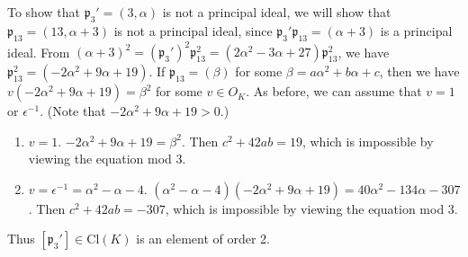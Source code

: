 \documentclass{article}
\newcommand{\Cl}{\mathrm{Cl}}
\begin{document}
To show that $\mathfrak{p}_{3}' = (3, \alpha)$ is not a principal ideal, we will show that $\mathfrak{p}_{13} = (13, \alpha + 3)$ is not a principal ideal, since $\mathfrak{p}_{3}'\mathfrak{p}_{13} = (\alpha + 3)$ is a  principal ideal. From $(\alpha+3)^{2} = (\mathfrak{p}_{3}')^{2}\mathfrak{p}_{13}^{2} = (2\alpha^{2} - 3\alpha + 27)\mathfrak{p}_{13}^{2}$, we have $\mathfrak{p}_{13}^{2} = (-2\alpha^{2} + 9\alpha + 19)$. 
If $\mathfrak{p}_{13} = (\beta)$ for some $\beta = a\alpha^{2} + b\alpha + c$, then we have $v(-2\alpha^{2} + 9\alpha + 19) = \beta^{2}$ for some $v\in O_{K}$. 
As before, we can assume that $v = 1$ or $\epsilon^{-1}$. (Note that $-2\alpha^{2} + 9\alpha + 19>0$.) 
\begin{enumerate}
\item $v = 1$. $-2\alpha^{2} + 9\alpha + 19 = \beta^{2}$. Then $c^{2} + 42 ab = 19$, which is impossible by viewing the equation mod 3. 
\item $v =\epsilon^{-1} =  \alpha^{2} - \alpha - 4$. $(\alpha^{2} - \alpha - 4)(-2\alpha^{2} + 9\alpha + 19) = 40\alpha^{2} - 134\alpha -307$. Then $c^{2} + 42ab = -307$, which is impossible by viewing the equation mod 3. 
\end{enumerate}
Thus $[\mathfrak{p}_{3}']\in\Cl(K)$ is an element of order 2.
\end{document}
